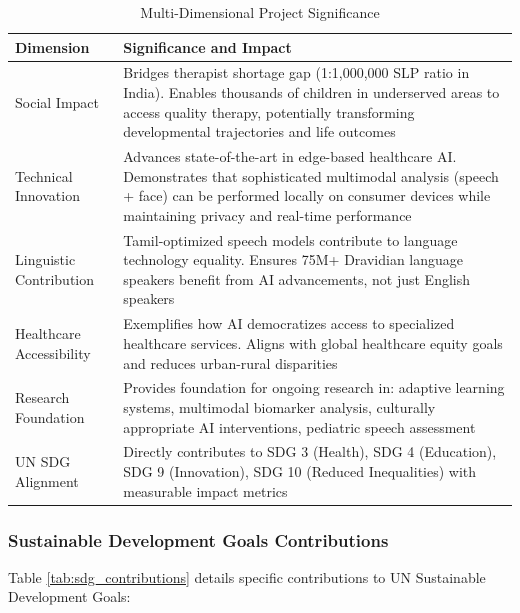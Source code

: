 \documentclass[12pt,a4paper]{article}
\begin{document}
\begin{table}[H]
\centering
\caption{Multi-Dimensional Project Significance}
\label{tab:significance}
\begin{tabular}{p{4.5cm}p{9cm}}
\toprule
\textbf{Dimension} & \textbf{Significance and Impact} \\
\midrule
Social Impact & Bridges therapist shortage gap (1:1,000,000 SLP ratio in India). Enables thousands of children in underserved areas to access quality therapy, potentially transforming developmental trajectories and life outcomes \\
\hline
Technical Innovation & Advances state-of-the-art in edge-based healthcare AI. Demonstrates that sophisticated multimodal analysis (speech + face) can be performed locally on consumer devices while maintaining privacy and real-time performance \\
\hline
Linguistic Contribution & Tamil-optimized speech models contribute to language technology equality. Ensures 75M+ Dravidian language speakers benefit from AI advancements, not just English speakers \\
\hline
Healthcare Accessibility & Exemplifies how AI democratizes access to specialized healthcare services. Aligns with global healthcare equity goals and reduces urban-rural disparities \\
\hline
Research Foundation & Provides foundation for ongoing research in: adaptive learning systems, multimodal biomarker analysis, culturally appropriate AI interventions, pediatric speech assessment \\
\hline
UN SDG Alignment & Directly contributes to SDG 3 (Health), SDG 4 (Education), SDG 9 (Innovation), SDG 10 (Reduced Inequalities) with measurable impact metrics \\
\bottomrule
\end{tabular}
\end{table}

\subsubsection{Sustainable Development Goals Contributions}

Table \ref{tab:sdg_contributions} details specific contributions to UN Sustainable Development Goals:
\end{document}
